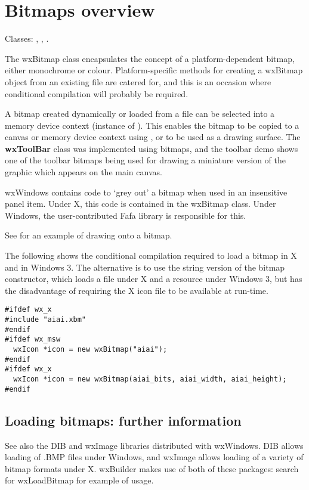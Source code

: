 \section{Bitmaps overview}\label{wxbitmapoverview}

Classes: , , .

The wxBitmap class encapsulates the concept of a platform-dependent bitmap,
either monochrome or colour. Platform-specific methods for creating a
wxBitmap object from an existing file are catered for, and
this is an occasion where conditional compilation will probably be
required.

A bitmap created dynamically or loaded from a file can be selected
into a memory device context (instance of ). This
enables the bitmap to be copied to a canvas or memory device context
using , or to be used as a drawing surface.  The {\bf
wxToolBar} class was implemented using bitmaps, and the toolbar demo
shows one of the toolbar bitmaps being used for drawing a miniature
version of the graphic which appears on the main canvas.

wxWindows contains code to `grey out' a bitmap when used in an insensitive
panel item. Under X, this code is contained in the wxBitmap class.
Under Windows, the user-contributed Fafa library is responsible for this.

See  for an example of drawing onto a bitmap.

The following shows the conditional compilation required to load a
bitmap in X and in Windows 3. The alternative is to use the string
version of the bitmap constructor, which loads a file under X and a
resource under Windows 3, but has the disadvantage of requiring the
X icon file to be available at run-time.

\begin{verbatim}
#ifdef wx_x
#include "aiai.xbm"
#endif
#ifdef wx_msw
  wxIcon *icon = new wxBitmap("aiai");
#endif
#ifdef wx_x
  wxIcon *icon = new wxBitmap(aiai_bits, aiai_width, aiai_height);
#endif
\end{verbatim}

\subsection{Loading bitmaps: further information}

See also the DIB and wxImage libraries distributed with
wxWindows. DIB allows loading of .BMP files under Windows, and
wxImage allows loading of a variety of bitmap formats under X.
wxBuilder makes use of both of these packages: search for wxLoadBitmap
for example of usage.

